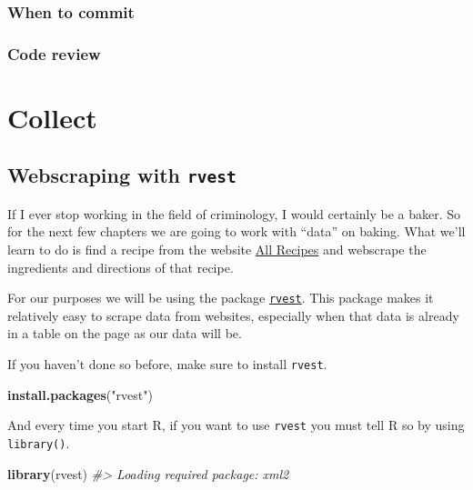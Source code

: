 \documentclass[
  12pt,
]{book}
\newenvironment{Shaded}{\begin{snugshade}}{\end{snugshade}}
\newcommand{\CommentTok}[1]{\textcolor[rgb]{0.56,0.35,0.01}{\textit{#1}}}
\newcommand{\KeywordTok}[1]{\textcolor[rgb]{0.13,0.29,0.53}{\textbf{#1}}}
\newcommand{\NormalTok}[1]{#1}
\newcommand{\StringTok}[1]{\textcolor[rgb]{0.31,0.60,0.02}{#1}}
\begin{document}
\hypertarget{when-to-commit}{%
\section{When to commit}\label{when-to-commit}}

\hypertarget{code-review}{%
\section{Code review}\label{code-review}}

\hypertarget{part-collect}{%
\part{Collect}\label{part-collect}}

\hypertarget{webscraping-with-rvest}{%
\chapter{\texorpdfstring{Webscraping with \texttt{rvest}}{Webscraping with rvest}}\label{webscraping-with-rvest}}

If I ever stop working in the field of criminology, I would certainly be a baker. So for the next few chapters we are going to work with ``data'' on baking. What we'll learn to do is find a recipe from the website \href{https://www.allrecipes.com/}{All Recipes} and webscrape the ingredients and directions of that recipe.

For our purposes we will be using the package \href{https://github.com/tidyverse/rvest}{\texttt{rvest}}. This package makes it relatively easy to scrape data from websites, especially when that data is already in a table on the page as our data will be.

If you haven't done so before, make sure to install \texttt{rvest}.

\begin{Shaded}
\begin{Highlighting}[]
\KeywordTok{install.packages}\NormalTok{(}\StringTok{"rvest"}\NormalTok{)}
\end{Highlighting}
\end{Shaded}

And every time you start R, if you want to use \texttt{rvest} you must tell R so by using \texttt{library()}.

\begin{Shaded}
\begin{Highlighting}[]
\KeywordTok{library}\NormalTok{(rvest)}
\CommentTok{\#> Loading required package: xml2}
\end{Highlighting}
\end{Shaded}
\end{document}
